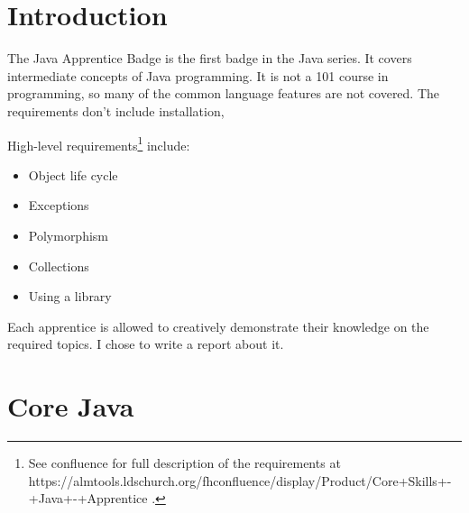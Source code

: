 \documentclass[fleqn,10pt]{SelfArx} %
\affiliation{\textsuperscript{1}\textit{FamilySearch, Salt Lake City}} %
\begin{document}
\flushbottom %

\maketitle %

\tableofcontents %

\thispagestyle{empty} %


\section*{Introduction} %


The Java Apprentice Badge is the first badge in the Java series. It covers intermediate concepts of Java programming. It is not a 101 course in programming, so many of the common language features are not covered. The requirements don't include installation, 

High-level requirements\footnote{See confluence for full description of the requirements at https://almtools.ldschurch.org/fhconfluence/display/Product/Core+Skills+-+Java+-+Apprentice .} include:
\begin{itemize}
\item Object life cycle
\item Exceptions
\item Polymorphism
\item Collections
\item Using a library
\end{itemize}

Each apprentice is allowed to creatively demonstrate their knowledge on the required topics. I chose to write a report about it.


\section{Core Java}
\end{document}

